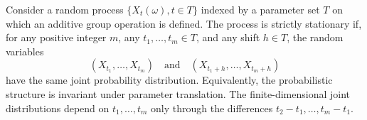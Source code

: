 Consider a random process $\{X_t(\omega), t \in T\}$ indexed by a parameter set $T$ on which an additive group operation is defined. The process is strictly stationary if, for any positive integer $m$, any $t_1, \ldots, t_m \in T$, and any shift $h \in T$, the random variables
$$(X_{t_1}, \ldots, X_{t_m}) \quad \text{and} \quad (X_{t_1+h}, \ldots, X_{t_m+h})$$
have the same joint probability distribution. Equivalently, the probabilistic structure is invariant under parameter translation. The finite-dimensional joint distributions depend on $t_1, \ldots, t_m$ only through the differences $t_2 - t_1, \ldots, t_m - t_1$.
